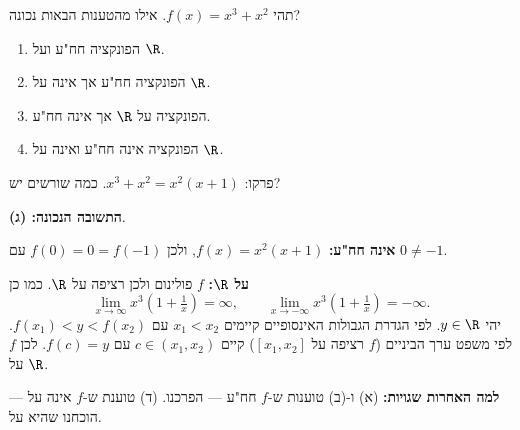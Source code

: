 
\begin{question}
תהי $f(x)=x^3+x^2$. אילו מהטענות הבאות נכונה?
\begin{enumerate}
  \item הפונקציה חח"ע ועל $\R$.
  \item הפונקציה חח"ע אך אינה על $\R$.
  \item הפונקציה על $\R$ אך אינה חח"ע.
  \item הפונקציה אינה חח"ע ואינה על $\R$.
\end{enumerate}
\end{question}

\begin{hint}
פרקו: $x^3+x^2=x^2(x+1)$. כמה שורשים יש?
\end{hint}

\begin{solution}
\textbf{התשובה הנכונה: (ג)}.

\textbf{אינה חח"ע:} $f(x)=x^2(x+1)$, ולכן $f(0)=0=f(-1)$ עם $0\neq-1$.

\textbf{על $\R$:} $f$ פולינום ולכן רציפה על $\R$. כמו כן
\[
\lim_{x\to\infty}x^3\left(1+\tfrac1x\right)=\infty,\qquad \lim_{x\to-\infty}x^3\left(1+\tfrac1x\right)=-\infty .
\]
יהי $y\in\R$. לפי הגדרת הגבולות האינסופיים קיימים $x_1<x_2$ עם $f(x_1)<y<f(x_2)$. לפי משפט ערך הביניים ($f$ רציפה על $[x_1,x_2]$) קיים $c\in(x_1,x_2)$ עם $f(c)=y$. לכן $f$ על $\R$.

\textbf{למה האחרות שגויות:} (א) ו-(ב) טוענות ש-$f$ חח"ע — הפרכנו. (ד) טוענת ש-$f$ אינה על — הוכחנו שהיא על.
\end{solution}

